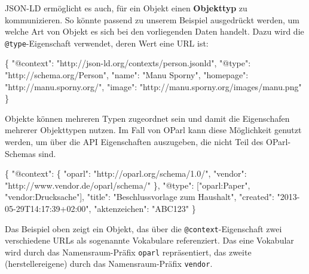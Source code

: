 \documentclass[,a4paper]{article}
\newenvironment{Shaded}{}{}
\newcommand{\DataTypeTok}[1]{\textcolor[rgb]{0.56,0.13,0.00}{{#1}}}
\newcommand{\StringTok}[1]{\textcolor[rgb]{0.25,0.44,0.63}{{#1}}}
\newcommand{\NormalTok}[1]{{#1}}
\begin{document}
JSON-LD ermöglicht es auch, für ein Objekt einen \textbf{Objekttyp} zu
kommunizieren. So könnte passend zu unserem Beispiel ausgedrückt werden,
um welche Art von Objekt es sich bei den vorliegenden Daten handelt.
Dazu wird die \texttt{@type}-Eigenschaft verwendet, deren Wert eine URL
ist:

\begin{Shaded}
\begin{Highlighting}[]
\NormalTok{\{}
  \DataTypeTok{"@context"}\NormalTok{: }\StringTok{"http://json-ld.org/contexts/person.jsonld"}\NormalTok{,}
  \DataTypeTok{"@type"}\NormalTok{: }\StringTok{"http://schema.org/Person"}\NormalTok{,}
  \DataTypeTok{"name"}\NormalTok{: }\StringTok{"Manu Sporny"}\NormalTok{,}
  \DataTypeTok{"homepage"}\NormalTok{: }\StringTok{"http://manu.sporny.org/"}\NormalTok{,}
  \DataTypeTok{"image"}\NormalTok{: }\StringTok{"http://manu.sporny.org/images/manu.png"}
\NormalTok{\}}
\end{Highlighting}
\end{Shaded}

Objekte können mehreren Typen zugeordnet sein und damit die Eigenschafen
mehrerer Objekttypen nutzen. Im Fall von OParl kann diese Möglichkeit
genutzt werden, um über die API Eigenschaften auszugeben, die nicht Teil
des OParl-Schemas sind.

\begin{Shaded}
\begin{Highlighting}[]
\NormalTok{\{}
  \DataTypeTok{"@context"}\NormalTok{: \{}
    \DataTypeTok{"oparl"}\NormalTok{: }\StringTok{"http://oparl.org/schema/1.0/"}\NormalTok{,}
    \DataTypeTok{"vendor"}\NormalTok{: }\StringTok{"http://www.vendor.de/oparl/schema/"}
  \NormalTok{\},}
  \DataTypeTok{"@type"}\NormalTok{: [}\StringTok{"oparl:Paper"}\NormalTok{, }\StringTok{"vendor:Drucksache"}\NormalTok{],}
  \DataTypeTok{"title"}\NormalTok{: }\StringTok{"Beschlussvorlage zum Haushalt"}\NormalTok{,}
  \DataTypeTok{"created"}\NormalTok{: }\StringTok{"2013-05-29T14:17:39+02:00"}\NormalTok{,}
  \DataTypeTok{"aktenzeichen"}\NormalTok{: }\StringTok{"ABC123"}
\NormalTok{\}}
\end{Highlighting}
\end{Shaded}

Das Beispiel oben zeigt ein Objekt, das über die
\texttt{@context}-Eigenschaft zwei verschiedene URLs als sogenannte
Vokabulare referenziert. Das eine Vokabular wird durch das
Namensraum-Präfix \texttt{oparl} repräsentiert, das zweite
(herstellereigene) durch das Namensraum-Präfix \texttt{vendor}.
\end{document}
